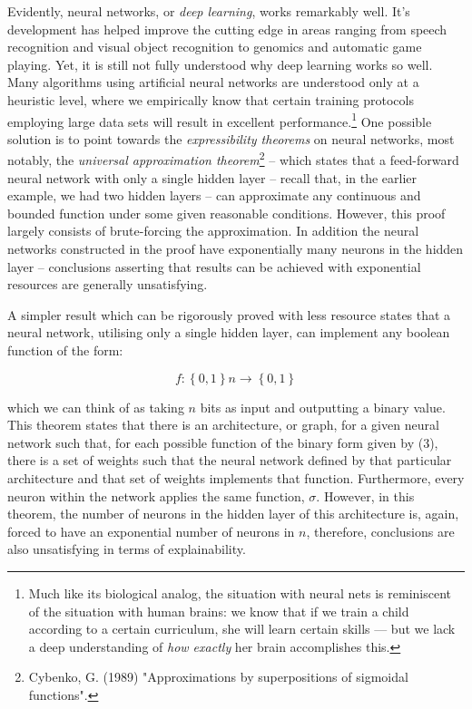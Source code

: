\documentclass[11pt]{article}
\begin{document}
Evidently, neural networks, or \textit{deep learning}, works remarkably well. It's development has helped improve the cutting edge in areas ranging from speech recognition and visual object recognition to genomics and automatic game playing. Yet, it is still not fully understood why deep learning works so well. Many algorithms using artificial neural networks are understood only at a heuristic level, where we empirically know that certain training protocols employing large data sets will result in excellent performance.\footnote{Much like its biological analog, the situation with neural nets is reminiscent of the situation with human brains: we know that if we train a child according to a certain curriculum, she will learn
certain skills — but we lack a deep understanding of \textit{how exactly} her brain accomplishes this.} One possible solution is to point towards the \textit{expressibility theorems} on neural networks, most notably, the \textit{universal approximation theorem}\footnote{Cybenko, G. (1989) "Approximations by superpositions of sigmoidal functions".} – which states that a feed-forward neural network with only a single hidden layer -- recall that, in the earlier example, we had two hidden layers -- can approximate any continuous and bounded function under some given reasonable conditions. However, this proof largely consists of brute-forcing the approximation. In addition the neural networks constructed in the proof have exponentially many neurons in the hidden layer – conclusions asserting that results can be achieved with exponential resources are generally unsatisfying.

A simpler result which can be rigorously proved with less resource states that a neural network, utilising only a single hidden layer, can implement any boolean function of the form:


\begin{equation}f: \left \{ 0,1 \right \}n \rightarrow  \left \{ 0,1 \right \} \end{equation}

which we can think of as taking $n$ bits as input and outputting a binary value. This theorem states that there is an architecture, or graph, for a given neural network such that, for each possible function of the binary form given by (3), there is a set of weights such that the neural network defined by that particular architecture and that set of weights implements that function. Furthermore, every neuron within the network applies the same function, $\sigma$. However, in this theorem, the number of neurons in the hidden layer of this architecture is, again, forced to have an exponential number of neurons in $n$, therefore, conclusions are also unsatisfying in terms of explainability.
\end{document}
